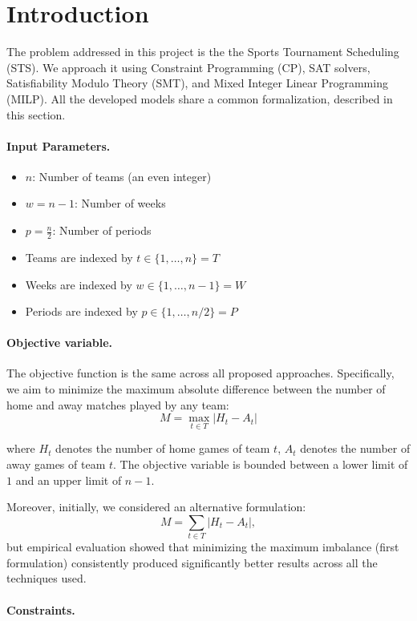 \documentclass{article}
\begin{document}
\section{Introduction}

The problem addressed in this project is the the Sports Tournament Scheduling (STS). We approach it using Constraint Programming (CP), SAT solvers, Satisfiability Modulo Theory (SMT), and Mixed Integer Linear Programming (MILP). All the developed models share a common formalization, described in this section.

\paragraph{Input Parameters.}
\begin{itemize}
    \item $n$: Number of teams (an even integer)
    \item $w = n-1$: Number of weeks
    \item $p = \frac{n}{2}$: Number of periods 
    \item Teams are indexed by $t \in \{1, \ldots, n\} = T$
    \item Weeks are indexed by $w \in \{1,\ldots, n-1\} = W$
    \item Periods are indexed by $p \in \{1, \ldots, n/2\} = P$
\end{itemize}


\paragraph{Objective variable.}
The objective function is the same across all proposed approaches. Specifically, we aim to minimize the maximum absolute difference between the number of home and away matches played by any team:
\[
M = \max_{t \in T} |H_t - A_t|
\]

where \(H_t\) denotes the number of home games of team \(t\), \(A_t\) denotes the number of away games of team \(t\). The objective variable is bounded between a lower limit of $1$ and an upper limit of $n-1$.

Moreover, initially, we considered an alternative formulation: 
\[
M = \sum_{t \in T} |H_t - A_t|,
\]
but empirical evaluation showed that minimizing the maximum imbalance (first formulation) consistently produced significantly better results across all the techniques used.

\paragraph{Constraints.}
\end{document}
